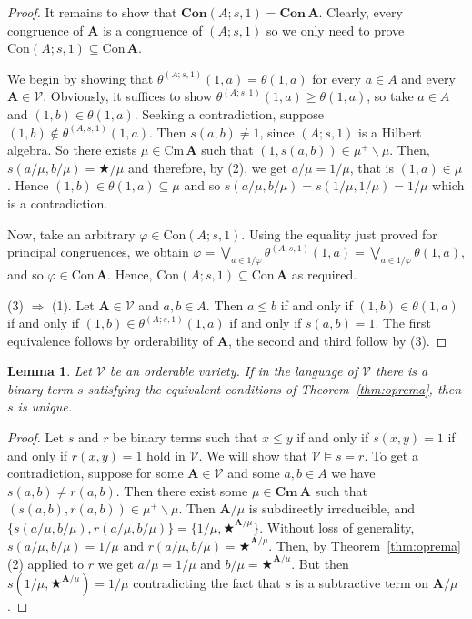 \documentclass{amsart}
\newtheorem{lemma}[theorem]{Lemma}
\newcommand{\alg}[1]{\mathbf{#1}}
\newcommand{\Con}[1]{\mathbf{Con}\, #1}
\newcommand{\con}[1]{\mathrm{Con}\, #1}
\newcommand{\Cm}[1]{\mathbf{Cm}\, #1}
\newcommand{\cm}[1]{\mathrm{Cm}\, #1}
\def\Ra{\Rightarrow}
\def\op{\bigstar}
\begin{document}
\begin{proof}
It remains to show that $\mathbf{Con}(A; s,1) = \Con{\alg{A}}$. Clearly, every
congruence of $\alg{A}$ is a congruence of $(A; s,1)$ so we only need to prove
$\mathrm{Con}(A;s,1)\subseteq \con{\alg{A}}$.

We begin by showing that $\theta^{(A;s,1)}(1,a) = \theta(1,a)$
for every $a\in A$ and every $\alg{A}\in\mathcal{V}$. 
Obviously, it suffices to show $\theta^{(A;s,1)}(1,a)\geq \theta(1,a)$, so
take $a\in A$ and $(1,b)\in\theta(1,a)$. Seeking a contradiction, suppose
$(1,b)\notin\theta^{(A;s,1)}(1,a)$. Then $s(a,b)\neq 1$, since $(A;s,1)$ is a
Hilbert algebra. So there exists $\mu\in\cm{\alg{A}}$ such that
$(1,s(a,b))\in\mu^+\smallsetminus\mu$. Then, $s(a/\mu, b/\mu) = \op/\mu$ and
therefore, by (2), we get $a/\mu = 1/\mu$, that is $(1,a)\in\mu$. Hence
$(1,b)\in \theta(1,a)\subseteq\mu$ and so
$s(a/\mu,b/\mu) = s(1/\mu,1/\mu) = 1/\mu$ which is a contradiction.

Now, take an arbitrary $\varphi\in\mathrm{Con}(A;s,1)$. Using the equality
just proved for principal congruences, we obtain
$\varphi = \bigvee_{a\in 1/\varphi}\theta^{(A;s,1)}(1,a) =
\bigvee_{a\in 1/\varphi}\theta(1,a)$,  and so $\varphi\in\con{\alg{A}}$.
Hence, $\mathrm{Con}(A;s,1)\subseteq \con{\alg{A}}$ as required.

(3) $\Ra$ (1). Let $\alg{A}\in\mathcal{V}$ and $a,b\in A$. Then $a\leq b$ if and
only if $(1,b)\in\theta(1,a)$ if and only if $(1,b)\in \theta^{(A;s,1)}(1,a)$
if and only if $s(a,b) = 1$. The first equivalence follows by 
orderability of $\alg{A}$, the second and third follow by (3).
\end{proof}  

\begin{lemma}\label{lem:unique}
Let $\mathcal{V}$ be an orderable variety. If in the
language of $\mathcal{V}$ there is a binary term $s$
satisfying the equivalent conditions
of Theorem~\ref{thm:oprema}, then $s$ is unique.
\end{lemma}  

\begin{proof}
Let $s$ and $r$ be binary terms such that
$x\leq y$ if and only if $s(x,y) = 1$ if and only if $r(x,y) = 1$
hold in $\mathcal{V}$. We will show that $\mathcal{V}\models s = r$. 
To get a contradiction, suppose for some $\alg{A}\in\mathcal{V}$ and some
$a,b\in A$ we have $s(a,b)\neq r(a,b)$. Then there exist some $\mu\in
\Cm{\alg{A}}$ such that $(s(a,b), r(a,b))\in\mu^+\smallsetminus\mu$. Then
$\alg{A}/\mu$ is subdirectly irreducible, and
$\{s(a/\mu,b/\mu), r(a/\mu,b/\mu)\} = \{1/\mu, \op^{\alg{A}/\mu}\}$. 
Without loss of generality, $s(a/\mu,b/\mu) = 1/\mu$ and
$r(a/\mu,b/\mu) = \op^{\alg{A}/\mu}$. Then, by Theorem~\ref{thm:oprema}(2)
applied to $r$ we get $a/\mu = 1/\mu$ and $b/\mu = \op^{\alg{A}/\mu}$.
But then $s(1/\mu,\op^{\alg{A}/\mu}) = 1/\mu$ contradicting the fact that
$s$ is a subtractive term on $\alg{A}/\mu$.
\end{proof}  
\end{document}
